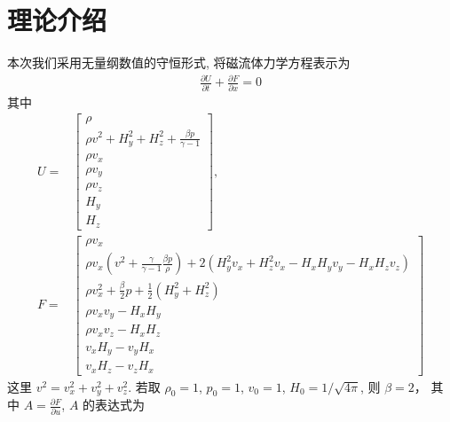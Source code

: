 \documentclass[10.5pt
]{article}
\begin{document}
\section{理论介绍}\label{DLess}
本次我们采用无量纲数值的守恒形式, 将磁流体力学方程表示为
\begin{align}
\frac{\partial U}{\partial t} + \frac{\partial F}{\partial x} = 0 \label{Eqn:MHD}
\end{align}
其中
\begin{align}
U = & \left[ \begin{array}{l}
\rho\\
\rho v^2 + H_y^2 + H_z^2 + \frac{\beta p}{\gamma -1}
\\
\rho v_x\\
\rho v_y\\
\rho v_z\\
H_y\\
H_z
\end{array} \right]\label{Eqn:Flux_U}, \\
F = & \left[ \begin{array}{l}
\rho v_x\\
\rho v_x \left(v^2 + \frac{\gamma}{\gamma - 1} \frac{\beta p}{\rho} \right) + 2(H_y^2 v_x + H_z^2 v_x - H_x H_y v_y - H_x H_z v_z)
\\
\rho v_x^2 + \frac{\beta}{2} p + \frac{1}{2} (H_y^2 + H_z^2)\\
\rho v_x v_y - H_x H_y\\
\rho v_x v_z - H_x H_z\\
v_x H_y - v_y H_x\\
v_x H_z - v_z H_x
\end{array} \right] \label{Eqn:Flux}
\end{align}
这里 $v^2 = v_x^2 + v_y^2 + v_z^2$. 若取 $\rho_0 = 1$, $p_0 = 1$, $v_0 = 1$, $H_0 = 1/\sqrt{4\pi}$, 则 $\beta = 2$，
其中 $A = \frac{\partial F}{\partial u}$, $A$ 的表达式为
\end{document}

